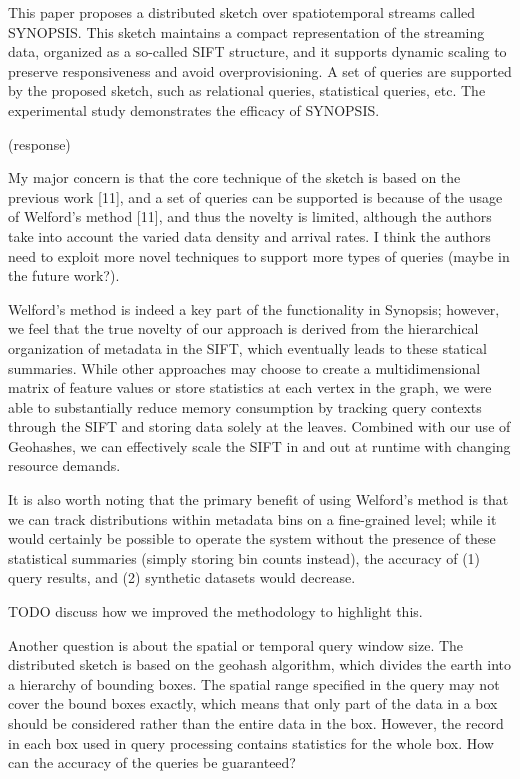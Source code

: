 \documentclass{article}
\begin{document}
This paper proposes a distributed sketch over spatiotemporal streams
called SYNOPSIS. This sketch maintains a compact representation of the
streaming data, organized as a so-called SIFT structure, and it supports
dynamic scaling to preserve responsiveness and avoid overprovisioning. A
set of queries are supported by the proposed sketch, such as relational
queries, statistical queries, etc. The experimental study demonstrates
the efficacy of SYNOPSIS.

\begin{tcolorbox}
(response)
\end{tcolorbox}

My major concern is that the core technique of the sketch is based on
the previous work {[}11{]}, and a set of queries can be supported is
because of the usage of Welford's method {[}11{]}, and thus the novelty
is limited, although the authors take into account the varied data
density and arrival rates. I think the authors need to exploit more
novel techniques to support more types of queries (maybe in the future
work?).

\begin{tcolorbox}
Welford's method is indeed a key part of the functionality in Synopsis;
however, we feel that the true novelty of our approach is derived from
the hierarchical organization of metadata in the SIFT, which eventually
leads to these statical summaries. While other approaches may choose to
create a multidimensional matrix of feature values or store statistics
at each vertex in the graph, we were able to substantially reduce memory
consumption by tracking query contexts through the SIFT and storing data
solely at the leaves. Combined with our use of Geohashes, we can
effectively scale the SIFT in and out at runtime with changing resource
demands.

It is also worth noting that the primary benefit of using Welford's
method is that we can track distributions within metadata bins on a
fine-grained level; while it would certainly be possible to operate the
system without the presence of these statistical summaries (simply
storing bin counts instead), the accuracy of (1) query results, and (2)
synthetic datasets would decrease.

TODO discuss how we improved the methodology to highlight this.
\end{tcolorbox}

Another question is about the spatial or temporal query window size. The
distributed sketch is based on the geohash algorithm, which divides the
earth into a hierarchy of bounding boxes. The spatial range specified in
the query may not cover the bound boxes exactly, which means that only
part of the data in a box should be considered rather than the entire
data in the box. However, the record in each box used in query
processing contains statistics for the whole box. How can the accuracy
of the queries be guaranteed?
\end{document}
